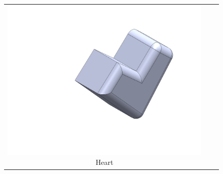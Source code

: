 \begin{figure}[htbp]
\begin{minipage}{0.5\textwidth}
\begin{tabular}{ccc}
\begin{minipage}{0.3\linewidth}
        \includegraphics[width=\linewidth]{figures/parts/heart.PNG}
        \scriptsize Heart
      \end{minipage} \\


\end{tabular}
\end{minipage}
\end{figure}
